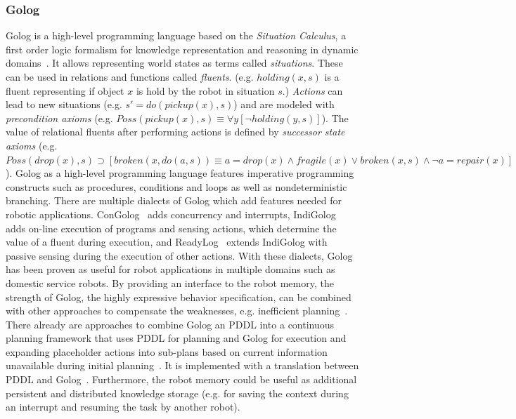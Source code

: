 \documentclass[a4paper,11pt]{article}
\begin{document}
\subsubsection{Golog } Golog is a high-level programming language based on the
\emph{Situation Calculus}, a first order logic formalism for knowledge
representation and reasoning in dynamic domains~\cite{Golog}. It
allows representing world states as terms called
\emph{situations}. These can be used in relations and functions called
\emph{fluents}. (e.g. $holding(x,s)$ is a fluent representing if
object $x$ is hold by the robot in situation $s$.) \emph{Actions} can
lead to new situations (e.g. $s'=do(pickup(x),s)$) and are modeled
with \emph{precondition axioms} (e.g. $Poss(pickup(x),s) \equiv
\forall y [\neg holding(y,s)]$). The value of relational fluents after
performing actions is defined by \emph{successor state axioms}
(e.g. $Poss(drop(x),s) \supset [broken(x,do(a,s)) \equiv a=drop(x)
  \wedge fragile(x) \vee broken(x,s) \wedge \neg a=repair(x)]$).
Golog as a high-level programming language features imperative
programming constructs such as procedures, conditions and loops as
well as nondeterministic branching. There are multiple dialects of
Golog which add features needed for robotic
applications. ConGolog~\cite{ConGolog} adds concurrency and
interrupts, IndiGolog~\cite{IndiGolog} adds on-line execution of
programs and sensing actions, which determine the value of a fluent
during execution, and ReadyLog~\cite{ferrein08ras} extends IndiGolog
with passive sensing during the execution of other actions. With these
dialects, Golog has been proven as useful for robot applications in
multiple domains such as domestic service robots. By providing an
interface to the robot memory, the strength of Golog, the highly
expressive behavior specification, can be combined with other
approaches to compensate the weaknesses, e.g. inefficient
planning~\cite{Golog-Planning}. There already are approaches to
combine Golog an PDDL into a continuous planning framework that uses
PDDL for planning and Golog for execution and expanding placeholder
actions into sub-plans based on current information unavailable during
initial planning~\cite{ContPlanGolog}. It is implemented with a
translation between PDDL and
Golog~\cite{Golog-PDDL-Trans}. Furthermore, the robot memory could be
useful as additional persistent and distributed knowledge storage
(e.g. for saving the context during an interrupt
and resuming the task by another robot).
\end{document}
